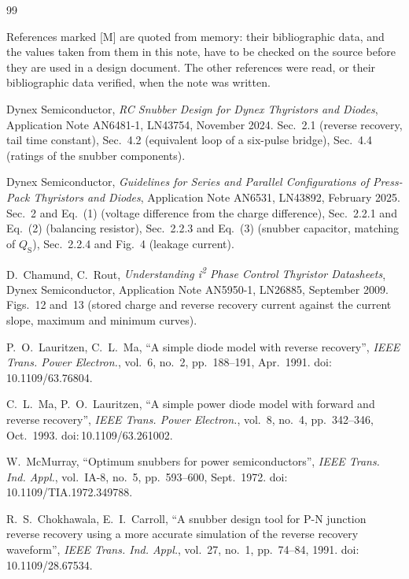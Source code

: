 \documentclass[10pt,a4paper]{scrartcl}
\begin{document}
\begin{thebibliography}{99}
\small
\item[] References marked [M] are quoted from memory: their bibliographic data, and the values taken from them in this note, have to be checked on the source before they are used in a design document. The other references were read, or their bibliographic data verified, when the note was written.

Dynex Semiconductor, \emph{RC Snubber Design for Dynex Thyristors and Diodes}, Application Note AN6481-1, LN43754, November 2024. Sec.~2.1 (reverse recovery, tail time constant), Sec.~4.2 (equivalent loop of a six-pulse bridge), Sec.~4.4 (ratings of the snubber components).

Dynex Semiconductor, \emph{Guidelines for Series and Parallel Configurations of Press-Pack Thyristors and Diodes}, Application Note AN6531, LN43892, February 2025. Sec.~2 and Eq.~(1) (voltage difference from the charge difference), Sec.~2.2.1 and Eq.~(2) (balancing resistor), Sec.~2.2.3 and Eq.~(3) (snubber capacitor, matching of $Q_\mathrm{S}$), Sec.~2.2.4 and Fig.~4 (leakage current).

D.~Chamund, C.~Rout, \emph{Understanding i\textsuperscript{2} Phase Control Thyristor Datasheets}, Dynex Semiconductor, Application Note AN5950-1, LN26885, September 2009. Figs.~12 and~13 (stored charge and reverse recovery current against the current slope, maximum and minimum curves).

P.~O.~Lauritzen, C.~L.~Ma, ``A simple diode model with reverse recovery'', \emph{IEEE Trans. Power Electron.}, vol.~6, no.~2, pp.~188--191, Apr.~1991. doi:\,10.1109/63.76804.

C.~L.~Ma, P.~O.~Lauritzen, ``A simple power diode model with forward and reverse recovery'', \emph{IEEE Trans. Power Electron.}, vol.~8, no.~4, pp.~342--346, Oct.~1993. doi:\,10.1109/63.261002.

W.~McMurray, ``Optimum snubbers for power semiconductors'', \emph{IEEE Trans. Ind. Appl.}, vol.~IA-8, no.~5, pp.~593--600, Sept.~1972. doi:\,10.1109/TIA.1972.349788.

R.~S.~Chokhawala, E.~I.~Carroll, ``A snubber design tool for P-N junction reverse recovery using a more accurate simulation of the reverse recovery waveform'', \emph{IEEE Trans. Ind. Appl.}, vol.~27, no.~1, pp.~74--84, 1991. doi:\,10.1109/28.67534.


\end{thebibliography}
\end{document}
